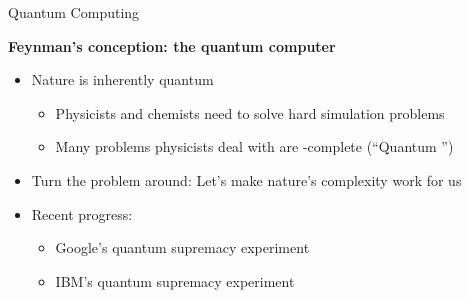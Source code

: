 \begin{refsection}
\begin{frame}{Quantum Computing}
	\begin{block}{\bf Feynman's conception: the quantum computer}
		\begin{itemize}
  		\item Nature is inherently quantum
		\begin{itemize}
  		\item Physicists and chemists need to solve hard simulation problems
  		\item Many problems physicists deal with are \QMA-complete (``Quantum \NP'')
		\end{itemize}
\pause
  		\item Turn the problem around: Let's make nature's complexity work for us
\pause
  		\item Recent progress:
		\begin{itemize}
  		\item Google's quantum supremacy experiment~\cite{arute2019quantum}
  		\item IBM's quantum supremacy experiment~\cite{kim2023evidence}
		\end{itemize}
		\end{itemize}
	\end{block}
	
	
\vfill
\printbibliography[section=\therefsection]
\end{frame}
\end{refsection}





